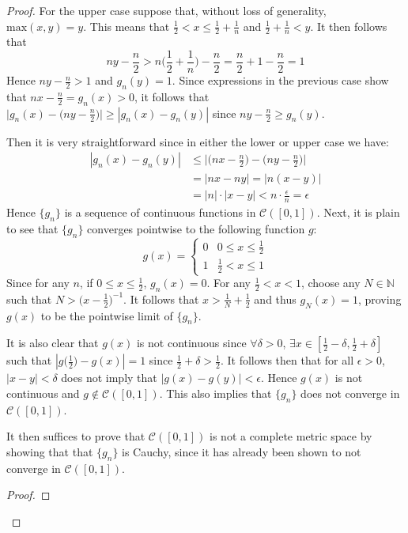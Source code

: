 \documentclass[12pt, letterpaper]{article}
\begin{document}
\begin{proof}
  For the upper case suppose that, without loss of generality, $\text{max}(x,y) = y$. This means that $\frac{1}{2} < x \leq \frac{1}{2} + \frac{1}{n}$ and $\frac{1}{2} + \frac{1}{n} < y$. It then follows that
  $$ ny - \frac{n}{2} > n\bigg(\frac{1}{2} + \frac{1}{n}\bigg) - \frac{n}{2} = \frac{n}{2} + 1 - \frac{n}{2} = 1$$
  Hence $ny - \frac{n}{2} > 1$ and $g_n(y) = 1$. Since expressions in the previous case show that $nx - \frac{n}{2} = g_n(x) > 0 $, it follows that $\big|g_n(x) - \big(ny - \frac{n}{2}\big)\big| \geq |g_n(x) - g_n(y)|$ since $ny - \frac{n}{2} \geq g_n(y)$.

  Then it is very straightforward since in either the lower or upper case we have:
  \begin{align*}
    |g_n(x) - g_n(y)| &\leq \Big|\Big(nx - \frac{n}{2}\Big) - \Big(ny - \frac{n}{2}\Big)\Big|\\
    &= |nx - ny| = |n(x-y)|\\
    &= |n|\cdot|x-y| < n\cdot\frac{\epsilon}{n} = \epsilon
  \end{align*}
  Hence $\{g_n\}$ is a sequence of continuous functions in $\mathcal{C}([0,1])$. Next, it is plain to see that $\{g_n\}$ converges pointwise to the following function $g$:
  \[
  g(x) =
  \begin{cases}
      0 & 0 \leq x \leq \frac{1}{2} \\
      1 & \frac{1}{2} < x \leq 1
   \end{cases}
  \]
  Since for any $n$, if $0 \leq x \leq \frac{1}{2}$, $g_n(x) = 0$. For any $\frac{1}{2} < x < 1$, choose any $N \in \mathbb{N}$ such that $N > \big(x - \frac{1}{2}\big)^{-1}$. It follows that $x > \frac{1}{N} + \frac{1}{2}$ and thus $g_N(x) = 1$, proving $g(x)$ to be the pointwise limit of $\{g_n\}$.
  \par It is also clear that $g(x)$ is not continuous since $\forall \delta > 0$, $\exists x \in [\frac{1}{2} - \delta, \frac{1}{2} + \delta]$ such that $|g\big(\frac{1}{2}\big) - g(x)| = 1$ since $\frac{1}{2} + \delta > \frac{1}{2}$. It follows then that for all $\epsilon > 0$, $|x - y| < \delta$ does not imply that $|g(x) - g(y)| < \epsilon$. Hence $g(x)$ is not continuous and $g \notin \mathcal{C}([0,1])$. This also implies that $\{g_n\}$ does not converge in $\mathcal{C}([0,1])$.
  \par It then suffices to prove that $\mathcal{C}([0,1])$ is not a complete metric space by showing that that $\{g_n\}$ is Cauchy, since it has already been shown to not converge in $\mathcal{C}([0,1])$.
  \begin{proof}

\end{proof}
\end{proof}
\end{document}
